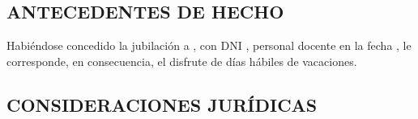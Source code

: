 

\subsection*{ANTECEDENTES DE HECHO}

\noindent Habiéndose concedido la jubilación a  , con 
DNI , personal docente en la fecha , le corresponde, en 
consecuencia, el disfrute de  días hábiles de vacaciones.

\subsection*{CONSIDERACIONES JURÍDICAS}
